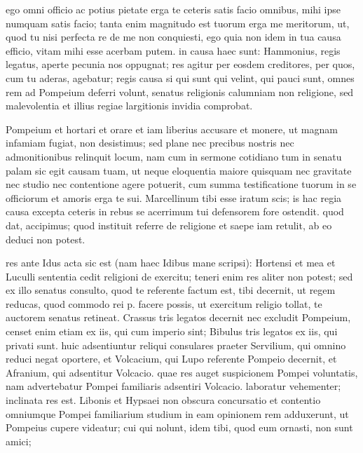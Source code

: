 


 ego omni officio ac potius pietate erga te ceteris satis facio omnibus, mihi ipse numquam satis facio; tanta enim magnitudo est tuorum erga me meritorum, ut, quod tu nisi perfecta re de me non conquiesti, ego quia non idem in tua causa efficio, vitam mihi esse acerbam putem. in causa haec sunt: Hammonius, regis legatus, aperte pecunia nos oppugnat; res agitur per eosdem creditores, per quos, cum tu aderas, agebatur; regis causa si qui sunt qui velint, qui pauci sunt, omnes rem ad Pompeium deferri volunt, senatus religionis calumniam non religione, sed malevolentia et illius regiae largitionis invidia comprobat.

 Pompeium et hortari et orare et iam liberius accusare et monere, ut magnam infamiam fugiat, non desistimus; sed plane nec precibus nostris nec admonitionibus relinquit locum, nam cum in sermone cotidiano tum in senatu palam sic egit causam tuam, ut neque eloquentia maiore quisquam nec gravitate nec studio nec contentione agere potuerit, cum summa testificatione tuorum in se officiorum et amoris erga te sui. Marcellinum tibi esse iratum scis; is hac regia causa excepta ceteris in rebus se acerrimum tui defensorem fore ostendit. quod dat, accipimus; quod instituit referre de religione et saepe iam retulit, ab eo deduci non potest.

 res ante Idus acta sic est (nam haec Idibus mane scripsi): Hortensi et mea et Luculli sententia cedit religioni de exercitu; teneri enim res aliter non potest; sed ex illo senatus consulto, quod te referente factum est, tibi decernit, ut regem reducas, quod commodo rei p. facere possis, ut exercitum religio tollat, te auctorem senatus retineat. Crassus tris legatos decernit nec excludit Pompeium, censet enim etiam ex iis, qui cum imperio sint; Bibulus tris legatos ex iis, qui privati sunt. huic adsentiuntur reliqui consulares praeter Servilium, qui omnino reduci negat oportere, et Volcacium, qui Lupo referente Pompeio decernit, et Afranium, qui adsentitur Volcacio. quae res auget suspicionem Pompei voluntatis, nam advertebatur Pompei familiaris adsentiri Volcacio. laboratur vehementer; inclinata res est. Libonis et Hypsaei non obscura concursatio et contentio omniumque Pompei familiarium studium in eam opinionem rem adduxerunt, ut Pompeius cupere videatur; cui qui nolunt, idem tibi, quod eum ornasti, non sunt amici;

